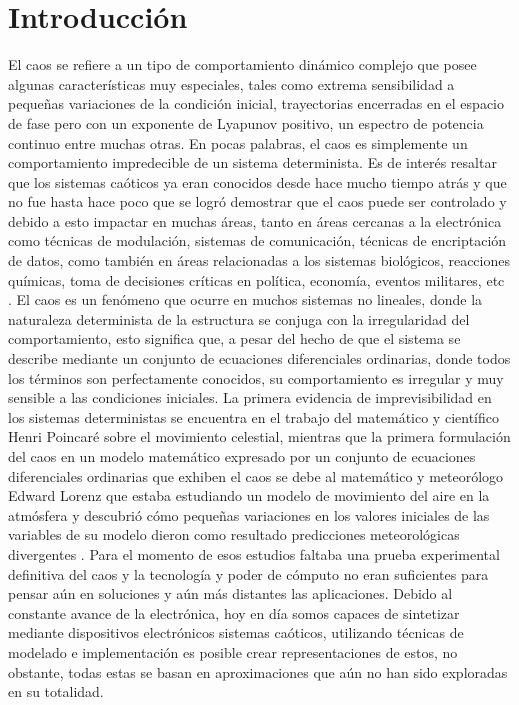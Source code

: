 \chapter{Introducción}
	
	El caos se refiere a un tipo de comportamiento dinámico complejo que posee algunas características muy especiales, tales como extrema sensibilidad a pequeñas variaciones de la condición inicial, trayectorias encerradas en el espacio de fase pero con un exponente de Lyapunov positivo, un espectro de potencia continuo entre muchas otras. En pocas palabras, el caos es simplemente un comportamiento impredecible de un sistema determinista. Es de interés resaltar que los sistemas caóticos ya eran conocidos desde hace mucho tiempo atrás y que no fue hasta hace poco que se logró demostrar que el caos puede ser controlado y debido a esto impactar en muchas áreas, tanto en áreas cercanas a la electrónica como técnicas de modulación, sistemas de comunicación, técnicas de encriptación de datos, como también en áreas  relacionadas a los sistemas biológicos, reacciones químicas, toma de decisiones críticas en política, economía, eventos militares, etc  \cite{Munoz-Pacheco2010}. El caos es un fenómeno que ocurre en muchos sistemas no lineales, donde la naturaleza determinista de la estructura se conjuga con la irregularidad del comportamiento, esto significa que, a pesar del hecho de que el sistema se describe mediante un conjunto de ecuaciones diferenciales ordinarias, donde todos los términos son perfectamente conocidos, su comportamiento es irregular y muy sensible a las condiciones iniciales. La primera evidencia de imprevisibilidad en los sistemas deterministas se encuentra en el trabajo del matemático y científico Henri Poincaré sobre el movimiento celestial, mientras que la primera formulación del caos en un modelo matemático expresado por un conjunto de ecuaciones diferenciales ordinarias que exhiben el caos se debe al matemático y meteorólogo Edward Lorenz que estaba estudiando un modelo de movimiento del aire en la atmósfera y descubrió cómo pequeñas variaciones en los valores iniciales de las variables de su modelo dieron como resultado predicciones meteorológicas divergentes \cite{Buscarino2014}. Para el momento de esos estudios faltaba una prueba experimental definitiva del caos y la tecnología y poder de cómputo no eran suficientes para pensar aún en soluciones y aún más distantes las aplicaciones. Debido al constante avance de la electrónica, hoy en día somos capaces de sintetizar mediante dispositivos electrónicos sistemas caóticos, utilizando técnicas de modelado e implementación es posible crear representaciones de estos, no obstante, todas estas se basan en aproximaciones que aún no han sido exploradas en su totalidad. 

